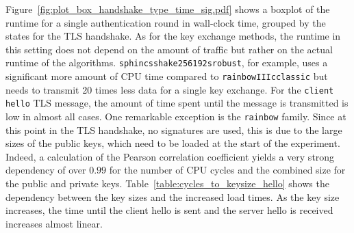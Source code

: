 Figure~\ref{fig:plot_box_handshake_type_time_sig.pdf} shows a boxplot of the runtime for a single authentication round in wall-clock time, grouped by the states for the TLS handshake. As for the key exchange methods, the runtime in this setting does not depend on the amount of traffic but rather on the actual runtime of the algorithms. \texttt{sphincsshake256192srobust}, for example, uses a significant more amount of \acs{CPU} time compared to \texttt{rainbowIIIcclassic} but needs to transmit 20 times less data for a single key exchange. For the \texttt{client hello} TLS message, the amount of time spent until the message is transmitted is low in almost all cases. One remarkable exception is the \texttt{rainbow} family. Since at this point in the TLS handshake, no signatures are used, this is due to the large sizes of the public keys, which need to be loaded at the start of the experiment. Indeed, a calculation of the Pearson correlation coefficient yields a very strong dependency of over \(0.99\) for the number of \acs{CPU} cycles and the combined size for the public and private keys. Table~\ref{table:cycles_to_keysize_hello} shows the dependency between the key sizes and the increased load times. As the key size increases, the time until the client hello is sent and the server hello is received increases almost linear.

